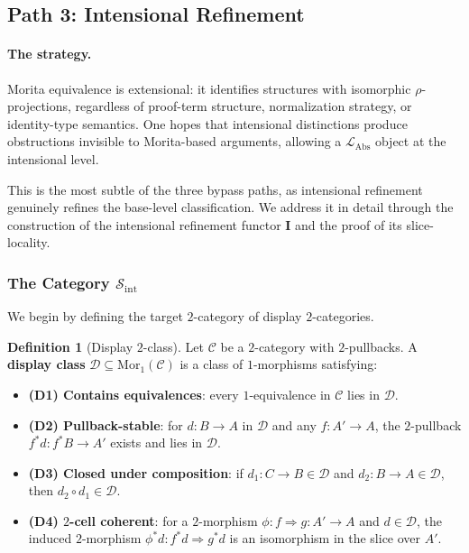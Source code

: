 \documentclass[11pt]{article}
\theoremstyle{plain}
\theoremstyle{definition}
\newtheorem{definition}[theorem]{Definition}
\newcommand{\cS}{\mathcal{S}}
\newcommand{\cC}{\mathcal{C}}
\newcommand{\cD}{\mathcal{D}}
\newcommand{\LAbs}{\mathcal{L}_{\mathrm{Abs}}}
\newcommand{\Sint}{\cS_{\mathrm{int}}}
\newcommand{\Mor}{\mathrm{Mor}}
\newcommand{\II}{\mathbf{I}}
\begin{document}
\subsection{Path 3: Intensional Refinement}\label{sec:bypass-intensional}

\paragraph{The strategy.} Morita equivalence is extensional: it identifies structures with isomorphic $\rho$-projections, regardless of proof-term structure, normalization strategy, or identity-type semantics. One hopes that intensional distinctions produce obstructions invisible to Morita-based arguments, allowing a $\LAbs$ object at the intensional level.

This is the most subtle of the three bypass paths, as intensional refinement genuinely refines the base-level classification. We address it in detail through the construction of the intensional refinement functor $\II$ and the proof of its slice-locality.

\subsubsection{\texorpdfstring{The Category $\Sint$}{The Category Sint}}

We begin by defining the target $2$-category of display $2$-categories.

\begin{definition}[Display $2$-class]\label{def:display-class}
Let $\cC$ be a $2$-category with $2$-pullbacks. A \textbf{display class} $\cD \subseteq \Mor_1(\cC)$ is a class of $1$-morphisms satisfying:
\begin{itemize}
\item \textbf{(D1) Contains equivalences}: every $1$-equivalence in $\cC$ lies in $\cD$.
\item \textbf{(D2) Pullback-stable}: for $d : B \to A$ in $\cD$ and any $f : A' \to A$, the $2$-pullback $f^*d : f^*B \to A'$ exists and lies in $\cD$.
\item \textbf{(D3) Closed under composition}: if $d_1 : C \to B \in \cD$ and $d_2 : B \to A \in \cD$, then $d_2 \circ d_1 \in \cD$.
\item \textbf{(D4) $2$-cell coherent}: for a $2$-morphism $\phi : f \Rightarrow g : A' \to A$ and $d \in \cD$, the induced $2$-morphism $\phi^* d : f^* d \Rightarrow g^* d$ is an isomorphism in the slice over $A'$.
\end{itemize}
\end{definition}
\end{document}
